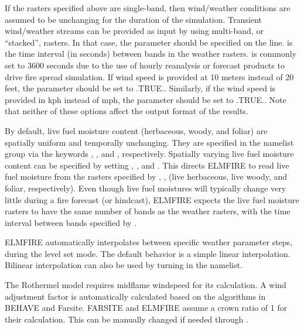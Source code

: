 If the rasters specified above are single-band, then wind/weather conditions are assumed to be unchanging for the duration of the simulation. Transient wind/weather streams can be provided as input by using multi-band, or “stacked”, rasters. In that case, the parameter  should be specified on the  line.  is the time interval (in seconds) between bands in the weather rasters.  is commonly set to 3600 seconds due to the use of hourly reanalysis or forecast products to drive fire spread simulation. If wind speed is provided at 10 meters instead of 20 feet, the parameter  should be set to .TRUE.. Similarly, if the wind speed is provided in kph instead of mph, the parameter  should be set to .TRUE.. Note that neither of these options affect the output format of the results. 

By default, live fuel moisture content (herbaceous, woody, and foliar) are spatially uniform and temporally unchanging. They are specified in the  namelist group via the keywords , , and , respectively. Spatially varying live fuel moisture content can be specified by setting , , and . This directs ELMFIRE to read live fuel moisture from the rasters specified by , ,  (live herbaceous, live woody, and foliar, respectively). Even though live fuel moistures will typically change very little during a fire forecast (or hindcast), ELMFIRE expects the live fuel moisture rasters to have the same number of bands as the weather rasters, with the time interval between bands specified by .

ELMFIRE automatically interpolates between specific weather parameter steps, during the level set mode. The default behavior is a simple linear interpolation. Bilinear interpolation can also be used by turning  in the  namelist.

The Rothermel model requires midflame windspeed for its calculation. A wind adjustment factor is automatically calculated based on the algorithms in BEHAVE and Farsite. FARSITE and ELMFIRE assume a crown ratio of 1 for their calculation. This can be manually changed if needed through . 

